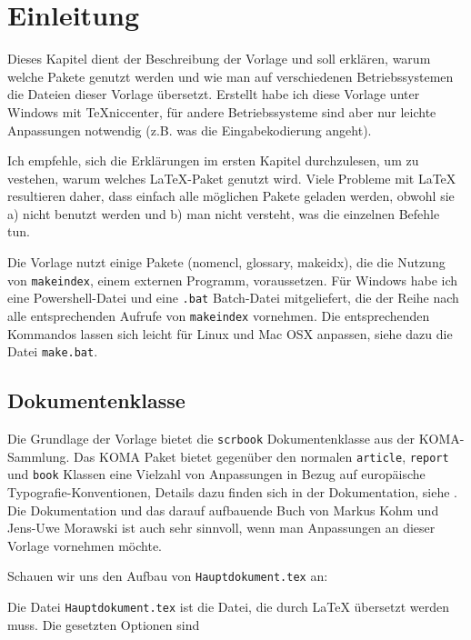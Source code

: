 \chapter{Einleitung}

Dieses Kapitel dient der Beschreibung der Vorlage und soll erklären, warum welche Pakete genutzt werden und wie man auf verschiedenen Betriebssystemen die Dateien dieser Vorlage übersetzt. Erstellt habe ich diese Vorlage unter Windows mit TeXniccenter, für andere Betriebssysteme sind aber nur leichte Anpassungen notwendig (z.B. was die Eingabekodierung angeht). 

Ich empfehle, sich die Erklärungen im ersten Kapitel durchzulesen, um zu vestehen, warum welches \LaTeX-Paket genutzt wird. Viele Probleme mit \LaTeX\xspace resultieren daher, dass einfach alle möglichen Pakete geladen werden, obwohl sie a) nicht benutzt werden und b) man nicht versteht, was die einzelnen Befehle tun. 

Die Vorlage nutzt einige Pakete (nomencl, glossary, makeidx), die die Nutzung von \texttt{makeindex}, einem externen Programm, voraussetzen. Für Windows habe ich eine Powershell-Datei und eine \texttt{.bat} Batch-Datei mitgeliefert, die der Reihe nach alle entsprechenden Aufrufe von \texttt{makeindex} vornehmen. Die entsprechenden Kommandos lassen sich leicht für Linux und Mac OSX anpassen, siehe dazu die Datei \texttt{make.bat}.



\section{Dokumentenklasse}

Die Grundlage der Vorlage bietet die \texttt{scrbook} Dokumentenklasse aus der KOMA-Sammlung. Das KOMA Paket bietet gegenüber den normalen \texttt{article}, \texttt{report} und \texttt{book} Klassen eine Vielzahl von Anpassungen in Bezug auf europäische Typografie-Konventionen, Details dazu finden sich in der Dokumentation, siehe \cite{koma}. Die Dokumentation und das darauf aufbauende Buch von Markus Kohm und Jens-Uwe Morawski ist auch sehr sinnvoll, wenn man Anpassungen an dieser Vorlage vornehmen möchte. 

Schauen wir uns den Aufbau von \texttt{Hauptdokument.tex} an:



Die Datei \texttt{Hauptdokument.tex} ist die Datei, die durch \LaTeX\xspace übersetzt werden muss. Die gesetzten Optionen sind

